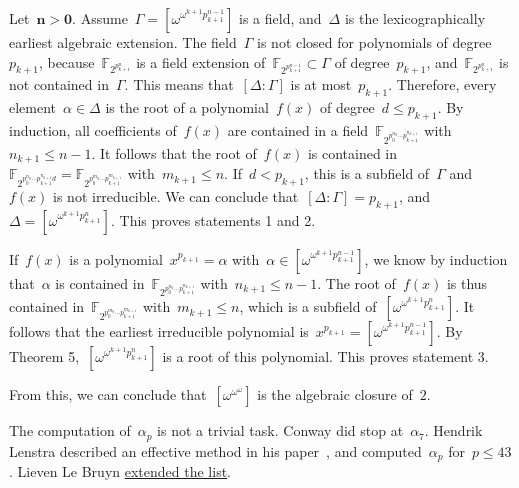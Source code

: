 Let~$\boldsymbol{n > 0}$. Assume~$\Gamma = [\omega^{\omega^{k+1} p_{k+1}^{n-1}}]$ is a field, and~$\Delta$ is the lexicographically earliest algebraic extension. The field~$\Gamma$ is not closed for polynomials of degree~$p_{k+1}$, because~$\mathbb{F}_{2^{p_{k+1}^n}}$ is a field extension of~$\mathbb{F}_{2^{p_{k+1}^{n-1}}} \subset \Gamma$ of degree~$p_{k+1}$, and~$\mathbb{F}_{2^{p_{k+1}^n}}$ is not contained in~$\Gamma$. This means that~$[\Delta:\Gamma]$ is at most~$p_{k+1}$. Therefore, every element~$\alpha \in \Delta$ is the root of a polynomial~$f(x)$ of degree~$d \leq p_{k+1}$. By induction, all coefficients of~$f(x)$ are contained in a field~$\mathbb{F}_{2^{p_0^{n_0} \dotsm p_{k+1}^{n_{k+1}}}}$ with~$n_{k+1} \leq n - 1$. It follows that the root of~$f(x)$ is contained in~$\mathbb{F}_{2^{p_0^{n_0} \dotsm p_{k+1}^{n_{k+1}}d}} = \mathbb{F}_{2^{p_0^{m_0} \dotsm p_{k+1}^{m_{k+1}}}}$ with~$m_{k+1} \leq n$. If~$d < p_{k+1}$, this is a subfield of~$\Gamma$ and~$f(x)$ is not irreducible. We can conclude that~$[\Delta:\Gamma] = p_{k+1}$, and~$\Delta = [\omega^{\omega^{k+1} p_{k+1}^{n}}]$. This proves statements 1 and 2.

If~$f(x)$ is a polynomial~$x^{p_{k+1}} = \alpha$ with~$\alpha \in [\omega^{\omega^{k+1} p_{k+1}^{n-1}}]$, we know by induction that~$\alpha$ is contained in~$\mathbb{F}_{2^{p_0^{n_0} \dotsm p_{k+1}^{n_{k+1}}}}$ with~$n_{k+1} \leq n - 1$. The root of~$f(x)$ is thus contained in~$\mathbb{F}_{2^{p_0^{m_0} \dotsm p_{k+1}^{m_{k+1}}}}$ with~$m_{k+1} \leq n$, which is a subfield of~$[\omega^{\omega^{k+1} p_{k+1}^{n}}]$. It follows that the earliest irreducible polynomial is~$x^{p_{k+1}} = [\omega^{\omega^{k+1} p_{k+1}^{n-1}}]$. By Theorem 5,~$[\omega^{\omega^{k+1} p_{k+1}^n}]$ is a root of this polynomial. This proves statement 3.

From this, we can conclude that~$[\omega^{\omega^\omega}]$ is the algebraic closure of~$2$.

\begin{remark}
  The computation of~$\alpha_p$ is not a trivial task. Conway did stop at~$\alpha_7$. Hendrik Lenstra described an effective method in his paper~\cite{lenstra-closure}, and computed~$\alpha_p$ for~$p \leq 43$. Lieven Le Bruyn \href{http://www.neverendingbooks.org/index.php/on2-extending-lenstras-list.html}{extended the list}.
\end{remark}
